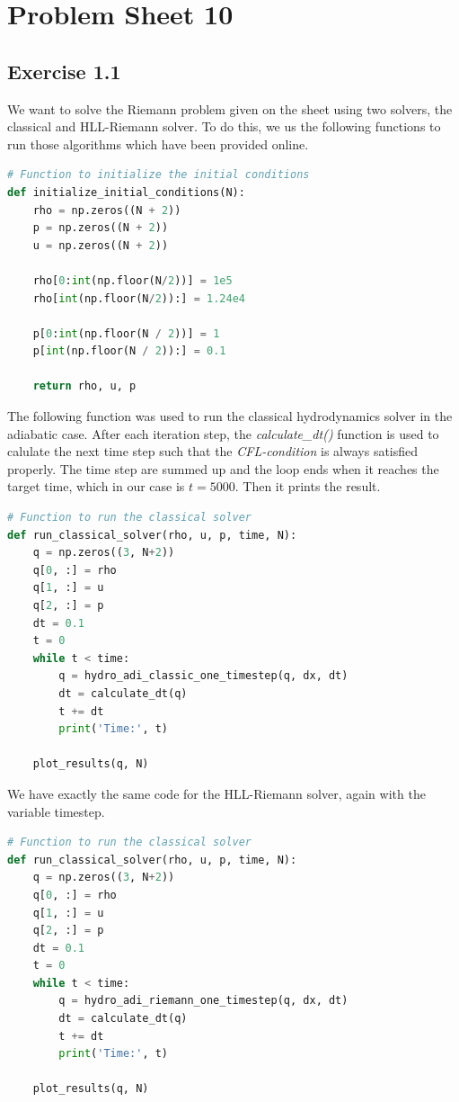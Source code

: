 \documentclass{scrartcl}
\begin{document}
\section*{Problem Sheet 10}
\subsection*{Exercise 1.1}
We want to solve the Riemann problem given on the sheet using two solvers, the classical and HLL-Riemann solver.
To do this, we us the following functions to run those algorithms which have been provided online.
\begin{lstlisting}[title=Function to initialize the initial conditions. We have to add one ghost cell at each boundary to make the algorithm work.,  language=Python, frame=single]
# Function to initialize the initial conditions
def initialize_initial_conditions(N):
	rho = np.zeros((N + 2))
	p = np.zeros((N + 2))
	u = np.zeros((N + 2))
	
	rho[0:int(np.floor(N/2))] = 1e5
	rho[int(np.floor(N/2)):] = 1.24e4
	
	p[0:int(np.floor(N / 2))] = 1
	p[int(np.floor(N / 2)):] = 0.1
	
	return rho, u, p
\end{lstlisting}
The following function was used to run the classical hydrodynamics solver in the adiabatic case.
After each iteration step, the \textit{calculate\_dt()} function is used to calulate the next time step such that the \textit{CFL-condition} is always satisfied properly.
The time step are summed up and the loop ends when it reaches the target time, which in our case is \( t = 5000 \).
Then it prints the result.
\begin{lstlisting}[title=Function to run the classical algorithm.,  language=Python, frame=single]
# Function to run the classical solver
def run_classical_solver(rho, u, p, time, N):
	q = np.zeros((3, N+2))
	q[0, :] = rho
	q[1, :] = u
	q[2, :] = p
	dt = 0.1
	t = 0
	while t < time:
		q = hydro_adi_classic_one_timestep(q, dx, dt)
		dt = calculate_dt(q)
		t += dt
		print('Time:', t)
	
	plot_results(q, N)
\end{lstlisting}
\newpage
We have exactly the same code for the HLL-Riemann solver, again with the variable timestep.
\begin{lstlisting}[title=Function to run the HLL-Riemann algorithm.,  language=Python, frame=single]
# Function to run the classical solver
def run_classical_solver(rho, u, p, time, N):
	q = np.zeros((3, N+2))
	q[0, :] = rho
	q[1, :] = u
	q[2, :] = p
	dt = 0.1
	t = 0
	while t < time:
		q = hydro_adi_riemann_one_timestep(q, dx, dt)
		dt = calculate_dt(q)
		t += dt
		print('Time:', t)
	
	plot_results(q, N)
\end{lstlisting}
\end{document}
